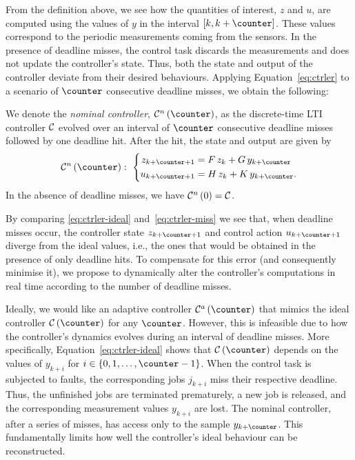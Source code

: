 From the definition above, we see how the quantities of interest, $z$ and $u$, are computed using the values of $y$ in the interval $\left[ k, k+\counter \right]$. 
These values correspond to the periodic measurements coming from the sensors.
%
In the presence of deadline misses, the control task discards the measurements and does not update the controller's state.
Thus, both the state and output of the controller deviate from their desired behaviours. 
Applying Equation~\eqref{eq:ctrler} to a scenario of $\counter$ consecutive deadline misses, we obtain the following:

\begin{definition}%
    We denote the \emph{nominal controller}, $\ctrler^n\funof{\counter}$, as the discrete-time LTI controller $\mathcal{C}$ evolved over an interval of $\counter$ consecutive deadline misses followed by one deadline hit. 
    After the hit, the state and output are given by
    \begin{equation}
        \label{eq:ctrler-miss}
        \ctrler^n\funof{\counter}:\,\, 
        \left\{\begin{aligned}
            z_{k+\counter+1} &= \Ac\,z_{k} + \Bc\,y_{k+\counter}\\
            u_{k+\counter+1} &= \Cc\,z_{k} + \Dc\,y_{k+\counter}.
        \end{aligned}\right.
    \end{equation}
    In the absence of deadline misses, we have $\mathcal{C}^n\left( 0 \right) = \mathcal{C}$.
\end{definition}

By comparing \eqref{eq:ctrler-ideal} and~\eqref{eq:ctrler-miss} we see that, when deadline misses occur, the controller state $z_{k+\counter+1}$ and control action $u_{k+\counter+1}$ diverge from the ideal values, i.e., the ones that would be obtained in the presence of only deadline hits. 
To compensate for this error (and consequently minimise it), we propose to dynamically alter the controller's computations in real time according to the number of deadline misses. 

Ideally, we would like an adaptive controller $\ctrler^a\funof{\counter}$ that mimics the ideal controller $\ctrler\funof{\counter}$ for any $\counter$.
However, this is infeasible due to how the controller's dynamics evolves during an interval of deadline misses.
More specifically, Equation~\eqref{eq:ctrler-ideal} shows that $\ctrler\funof{\counter}$ depends on the values of $y_{k+i}$ for $i \in \left\{ 0, 1, \ldots, \counter-1 \right\}$.
When the control task is subjected to faults, the corresponding jobs $j_{k+i}$ miss their respective deadline. 
Thus, the unfinished jobs are terminated prematurely, a new job is released, and the corresponding measurement values $y_{k+i}$ are lost.
The nominal controller, after a series of misses, has access only to the sample $y_{k+\counter}$.
This fundamentally limits how well the controller's ideal behaviour can be reconstructed.

